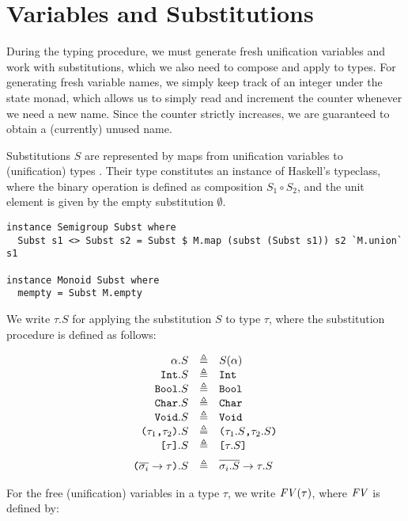 \section{Variables and Substitutions}

During the typing procedure, we must generate fresh unification variables and
work with substitutions, which we also need to compose and apply to types.
For generating fresh variable names, we simply keep track of an integer
 under the state monad, which allows us to simply read and
increment the counter whenever we need a new name. Since the counter strictly
increases, we are guaranteed to obtain a (currently) unused name.

Substitutions $S$ are represented by maps from unification variables
 to (unification) types . Their type 
constitutes an instance of Haskell's  typeclass, where the
binary operation is defined as composition $S_1 \circ S_2$, and the unit element
is given by the empty substitution $\emptyset$.

\begin{verbatim}
instance Semigroup Subst where
  Subst s1 <> Subst s2 = Subst $ M.map (subst (Subst s1)) s2 `M.union` s1

instance Monoid Subst where
  mempty = Subst M.empty
\end{verbatim}

We write $\tau.S$ for applying the substitution $S$ to type $\tau$, where the
substitution procedure is defined as follows:

\[
\begin{array}{rcl}
  \alpha.S & \eqdef & S(\alpha) \\
  \Int.S & \eqdef & \Int \\
  \Bool.S & \eqdef & \Bool \\
  \Char.S & \eqdef & \Char \\
  \Void.S & \eqdef & \Void \\
  \TProd{\tau_1}{\tau_2}.S & \eqdef & \TProd{\tau_1.S}{\tau_2.S} \\
  \TList{\tau}.S & \eqdef & \TList{\tau.S} \br
  \Parens{ \TFun{\set{\sigma_i}}{\tau} }.S & \eqdef & \TFun{\set{\sigma_i.S}}{\tau.S}
\end{array}
\]

For the free (unification) variables in a type $\tau$, we write $\mathit{FV}(\tau)$, where
$\mathit{FV}$ is defined by:

